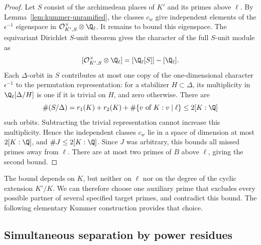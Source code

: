 \begin{proof}
Let $S$ consist of the archimedean places of $K'$ and its primes above $\ell$. By Lemma~\ref{lem:kummer-unramified}, the classes $c_w$ give independent elements of the $\epsilon^{-1}$ eigenspace in $\mathcal O_{K',S}^{\times}\otimes\Q_\ell$. It remains to bound this eigenspace. The equivariant Dirichlet $S$-unit theorem \cite[Section~3]{bass1966} gives the character of the full $S$-unit module as
\[
 [\mathcal O_{K',S}^{\times}\otimes\Q_\ell]
   =[\Q_\ell[S]]-[\Q_\ell].
\]
Each $\Delta$-orbit in $S$ contributes at most one copy of the one-dimensional character $\epsilon^{-1}$ to the permutation representation: for a stabilizer $H\subset\Delta$, its multiplicity in $\Q_\ell[\Delta/H]$ is one if it is trivial on $H$, and zero otherwise. There are
\[
 \#(S/\Delta)
 =r_1(K)+r_2(K)+\#\{v\text{ of }K:v\mid\ell\}
 \le2[K:\Q]
\]
such orbits. Subtracting the trivial representation cannot increase this multiplicity. Hence the independent classes $c_w$ lie in a space of dimension at most $2[K:\Q]$, and $\#J\le2[K:\Q]$. Since $J$ was arbitrary, this bounds all missed primes away from $\ell$. There are at most two primes of $B$ above $\ell$, giving the second bound.
\end{proof}

The bound depends on $K$, but neither on $\ell$ nor on the degree of the cyclic extension $K'/K$. We can therefore choose one auxiliary prime that excludes every possible partner of several specified target primes, and contradict this bound. The following elementary Kummer construction provides that choice.

\subsection{Simultaneous separation by power residues}


